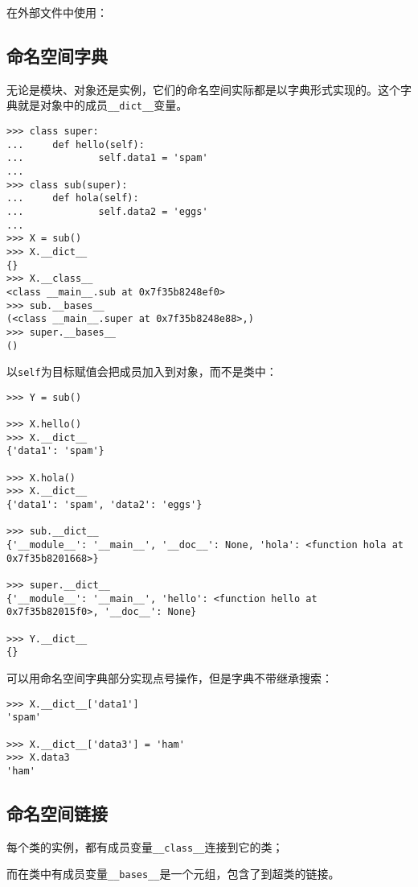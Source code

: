 在外部文件中使用：



\subsection{命名空间字典}

无论是模块、对象还是实例，它们的命名空间实际都是以字典形式实现的。这个字典就是对象中的成员\verb|__dict__|变量。

\begin{lstlisting}
>>> class super:
...     def hello(self):
...             self.data1 = 'spam'
... 
>>> class sub(super):
...     def hola(self):
...             self.data2 = 'eggs'
... 
>>> X = sub()
>>> X.__dict__
{}
>>> X.__class__
<class __main__.sub at 0x7f35b8248ef0>
>>> sub.__bases__
(<class __main__.super at 0x7f35b8248e88>,)
>>> super.__bases__
()
\end{lstlisting}

以\verb|self|为目标赋值会把成员加入到对象，而不是类中：

\begin{lstlisting}
>>> Y = sub()

>>> X.hello()
>>> X.__dict__
{'data1': 'spam'}

>>> X.hola()
>>> X.__dict__
{'data1': 'spam', 'data2': 'eggs'}

>>> sub.__dict__
{'__module__': '__main__', '__doc__': None, 'hola': <function hola at 0x7f35b8201668>}

>>> super.__dict__
{'__module__': '__main__', 'hello': <function hello at 0x7f35b82015f0>, '__doc__': None}

>>> Y.__dict__
{}
\end{lstlisting}

可以用命名空间字典部分实现点号操作，但是字典不带继承搜索：

\begin{lstlisting}
>>> X.__dict__['data1']
'spam'

>>> X.__dict__['data3'] = 'ham'
>>> X.data3
'ham'
\end{lstlisting}

\subsection{命名空间链接}

每个类的实例，都有成员变量\verb|__class__|连接到它的类；

而在类中有成员变量\verb|__bases__|是一个元组，包含了到超类的链接。

